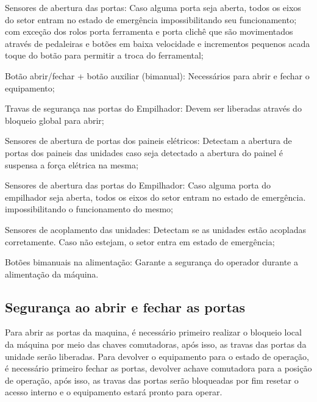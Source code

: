 \begin{safetyDevices}
  \item[\ding{\dingNumber}] Sensores de abertura das portas: Caso alguma porta seja aberta, todos os eixos do setor entram no estado de emergência
  impossibilitando seu funcionamento; com exceção dos rolos porta ferramenta e porta clichê que são movimentados através de pedaleiras e botões em baixa velocidade
  e incrementos pequenos acada toque do botão para permitir a troca do ferramental;
  \fi
  \ifmachineTypeIcv
  \item[\ding{\dingNumber}] Botão abrir/fechar + botão auxiliar (bimanual): Necessários para abrir e fechar o equipamento;
  \item[\ding{\dingNumber}] Travas de segurança nas portas do Empilhador: Devem ser liberadas através do bloqueio global para abrir;
  \item[\ding{\dingNumber}] Sensores de abertura de portas dos paineis elétricos: Detectam a abertura de portas dos paineis das unidades caso seja detectado a abertura do
   painel é suspensa a força elétrica na mesma;
  \item[\ding{\dingNumber}] Sensores de abertura das portas do Empilhador: Caso alguma porta do empilhador seja aberta, todos os eixos do setor entram no estado de emergência. 
  impossibilitando o funcionamento do mesmo;
  \fi
  \item[\ding{\dingNumber}] Sensores de acoplamento das unidades: Detectam se as unidades estão acopladas corretamente. Caso não estejam, o setor entra em estado de emergência;
  \item[\ding{\dingNumber}] Botões bimanuais na alimentação: Garante a segurança do operador durante a alimentação da máquina.

\end{safetyDevices}

\ifmachineTypeFlexo
\subsection{Segurança ao abrir e fechar as portas}

Para abrir as portas da maquina, é necessário primeiro realizar o bloqueio local da máquina por meio das chaves comutadoras, após isso, as travas das portas da unidade 
serão liberadas. Para devolver o equipamento para o estado de operação, é necessário primeiro fechar as portas, devolver achave comutadora para a posição de 
operação, após isso, as travas das portas serão bloqueadas por fim resetar o acesso interno e o equipamento estará pronto para operar.

